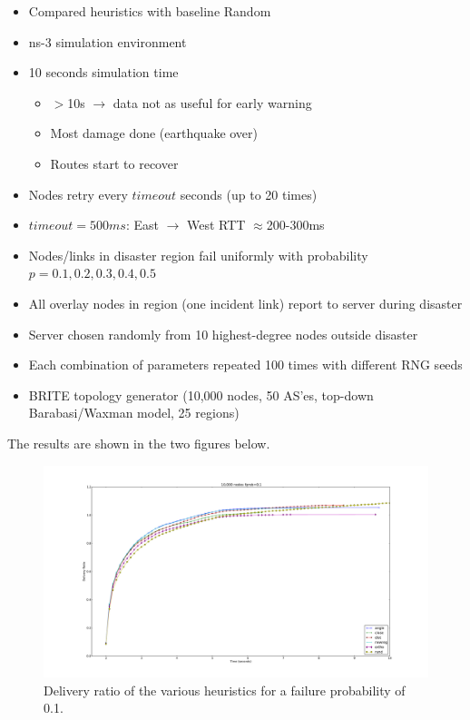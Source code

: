 \documentclass[conference]{IEEEtran}
\begin{document}
\begin{itemize}
	\item Compared heuristics with baseline Random
	\item ns-3 simulation environment
	\item 10 seconds simulation time
	\begin{itemize}
		\item $>$10s $\rightarrow$ data not as useful for early warning
		\item Most damage done (earthquake over)
		\item Routes start to recover
	\end{itemize}
	\item Nodes retry every $timeout$ seconds (up to 20 times)
	\item $timeout = 500ms$: East $\rightarrow$ West RTT $\approx$200-300ms
	\item Nodes/links in disaster region fail uniformly with probability $p = 0.1, 0.2, 0.3, 0.4, 0.5$
	\item All overlay nodes in region (one incident link) report to server during disaster
	\item Server chosen randomly from 10 highest-degree nodes outside disaster
	\item Each combination of parameters repeated 100 times with different RNG seeds
	\item BRITE topology generator (10,000 nodes, 50 AS'es, top-down Barabasi/Waxman model, 25 regions)
\end{itemize}

The results are shown in the two figures below.

\begin{figure}
\label{fprob1}
\includegraphics[width=6.0in]{../../images/plots/fprob1}
\vspace{-20pt}
\caption{Delivery ratio of the various heuristics for a failure probability of 0.1.}
\end{figure}
\end{document}

